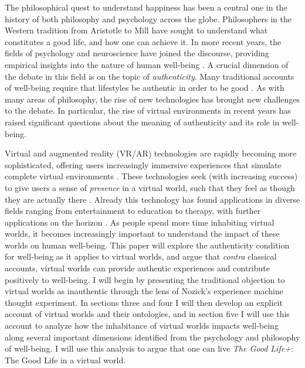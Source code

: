 The philosophical quest to understand happiness has been a central one in the 
history of both philosophy and psychology across the globe. Philosophers in
the Western tradition from Aristotle to Mill have sought to understand what
constitutes a good life, and how one can achieve it. In more recent years, the
fields of psychology and neuroscience have joined the discourse, providing
empirical insights into the nature of human well-being \citep{Stoll2014}. 
A crucial dimension of the debate in this field is on the topic of
\emph{authenticity}. Many traditional accounts of well-being require that
lifestyles be authentic in order to be good \citep{sep-authenticity}. As with 
many areas of philosophy, the rise of new technologies has brought new 
challenges to the debate. In particular, the rise of virtual environments in
recent years has raised significant questions about the meaning of authenticity
and its role in well-being.

Virtual and augmented reality (VR/AR) technologies are rapidly becoming more
sophisticated, offering users increasingly immersive experiences that simulate
complete virtual environments \citep{Wang_Siau_2024}. These technologies seek
(with increasing success) to give users a sense of \emph{presence} in a virtual
world, such that they feel as though they are actually there
\citep{slater2018immersion}. Already this technology has found applications in
diverse fields ranging from entertainment to education to therapy, with further
applications on the horizon \citep{ijerph191811278}. As people spend more time
inhabiting virtual worlds, it becomes increasingly important to understand the
impact of these worlds on human well-being. This paper will explore the
authenticity condition for well-being as it applies to virtual worlds, and argue
that \emph{contra} classical accounts, virtual worlds can provide authentic
experiences and contribute positively to well-being. I will begin by presenting
the traditional objection to virtual worlds as inauthentic through the lens of
Nozick's experience machine thought experiment. In sections three and four I will then
develop an explicit account of virtual worlds and their ontologies, and in
section five I will use this account to analyze how the inhabitance of virtual
worlds impacts well-being along several important dimensions identified from the
psychology and philosophy of well-being. I will use this analysis to argue that
one can live \emph{The Good Life+}: The Good Life in a virtual world.